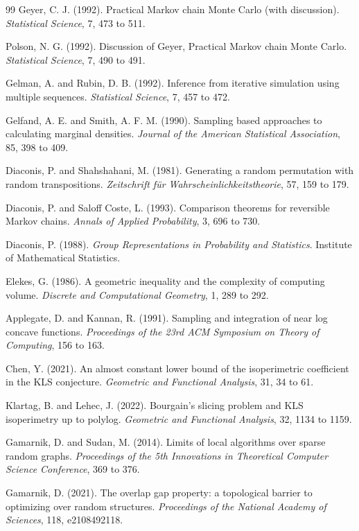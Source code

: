 \documentclass[11pt,twoside,openany]{book}
\theoremstyle{plain}
\theoremstyle{definition}
\theoremstyle{remark}
\begin{document}
\begin{thebibliography}{99}
 Geyer, C. J. (1992). Practical Markov chain Monte Carlo (with discussion). \emph{Statistical Science}, 7, 473 to 511.

 Polson, N. G. (1992). Discussion of Geyer, Practical Markov chain Monte Carlo. \emph{Statistical Science}, 7, 490 to 491.

 Gelman, A. and Rubin, D. B. (1992). Inference from iterative simulation using multiple sequences. \emph{Statistical Science}, 7, 457 to 472.

 Gelfand, A. E. and Smith, A. F. M. (1990). Sampling based approaches to calculating marginal densities. \emph{Journal of the American Statistical Association}, 85, 398 to 409.

 Diaconis, P. and Shahshahani, M. (1981). Generating a random permutation with random transpositions. \emph{Zeitschrift f\"ur Wahrscheinlichkeitstheorie}, 57, 159 to 179.

 Diaconis, P. and Saloff Coste, L. (1993). Comparison theorems for reversible Markov chains. \emph{Annals of Applied Probability}, 3, 696 to 730.

 Diaconis, P. (1988). \emph{Group Representations in Probability and Statistics}. Institute of Mathematical Statistics.

 Elekes, G. (1986). A geometric inequality and the complexity of computing volume. \emph{Discrete and Computational Geometry}, 1, 289 to 292.

 Applegate, D. and Kannan, R. (1991). Sampling and integration of near log concave functions. \emph{Proceedings of the 23rd ACM Symposium on Theory of Computing}, 156 to 163.

 Chen, Y. (2021). An almost constant lower bound of the isoperimetric coefficient in the KLS conjecture. \emph{Geometric and Functional Analysis}, 31, 34 to 61.

 Klartag, B. and Lehec, J. (2022). Bourgain's slicing problem and KLS isoperimetry up to polylog. \emph{Geometric and Functional Analysis}, 32, 1134 to 1159.

 Gamarnik, D. and Sudan, M. (2014). Limits of local algorithms over sparse random graphs. \emph{Proceedings of the 5th Innovations in Theoretical Computer Science Conference}, 369 to 376.

 Gamarnik, D. (2021). The overlap gap property: a topological barrier to optimizing over random structures. \emph{Proceedings of the National Academy of Sciences}, 118, e2108492118.


\end{thebibliography}
\end{document}
